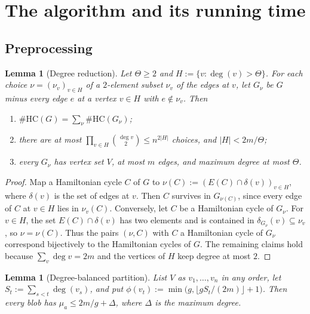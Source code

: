 \documentclass[11pt]{amsart}
\theoremstyle{plain}
\newtheorem{lemma}[theorem]{Lemma}
\theoremstyle{definition}
\theoremstyle{remark}
\numberwithin{equation}{section}
\newcommand{\HC}{\#\mathrm{HC}}
\begin{document}
\section{The algorithm and its running time}\label{sec:algorithm}

\subsection{Preprocessing}

\begin{lemma}[Degree reduction]\label{lem:degree-reduction}
Let $\Theta\ge2$ and $H:=\{v:\deg(v)>\Theta\}$. For each choice $\nu=(\nu_v)_{v\in H}$ of a
$2$-element subset $\nu_v$ of the edges at $v$, let $G_\nu$ be $G$ minus every edge $e$ at a vertex
$v\in H$ with $e\notin\nu_v$. Then
\begin{enumerate}[label=\textup{(\alph*)}]
\item $\HC(G)=\sum_\nu\HC(G_\nu)$;
\item there are at most $\prod_{v\in H}\binom{\deg v}{2}\le n^{2|H|}$ choices, and $|H|<2m/\Theta$;
\item every $G_\nu$ has vertex set $V$, at most $m$ edges, and maximum degree at most $\Theta$.
\end{enumerate}
\end{lemma}

\begin{proof}
Map a Hamiltonian cycle $C$ of $G$ to $\nu(C):=(E(C)\cap\delta(v))_{v\in H}$, where $\delta(v)$ is
the set of edges at $v$. Then $C$ survives in $G_{\nu(C)}$, since every edge of $C$ at $v\in H$
lies in $\nu_v(C)$. Conversely, let $C$ be a Hamiltonian cycle of $G_\nu$. For $v\in H$, the set
$E(C)\cap\delta(v)$ has two elements and is contained in $\delta_{G_\nu}(v)\subseteq\nu_v$, so
$\nu=\nu(C)$. Thus the pairs $(\nu,C)$ with $C$ a Hamiltonian cycle of $G_\nu$ correspond
bijectively to the Hamiltonian cycles of $G$. The remaining claims hold because $\sum_v\deg
v=2m$ and the vertices of $H$ keep degree at most $2$.
\end{proof}

\begin{lemma}[Degree-balanced partition]\label{lem:balanced}
List $V$ as $v_1,\dots,v_n$ in any order, let $S_t:=\sum_{s<t}\deg(v_s)$, and put
$\phi(v_t):=\min\bigl(g,\lfloor gS_t/(2m)\rfloor+1\bigr)$. Then every blob has $\mu_a\le 2m/g+\Delta$,
where $\Delta$ is the maximum degree.
\end{lemma}
\end{document}
